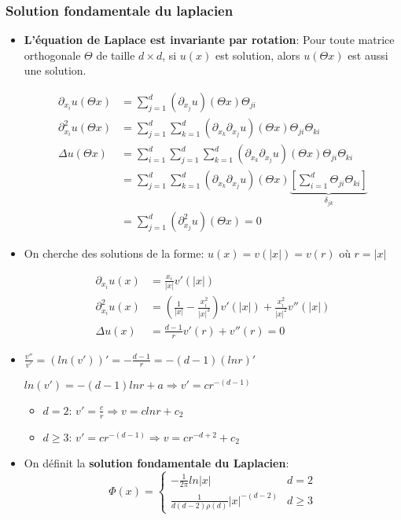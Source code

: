 \documentclass[10pt,a4paper,oneside]{article}
\begin{document}
\subsubsection{Solution fondamentale du laplacien}

\begin{itemize}
\item
\textbf{L'équation de Laplace est invariante par rotation}: Pour toute matrice orthogonale $\Theta$ de taille $d \times d$, si $u(x)$ est solution, alors $u(\Theta x)$ est aussi une solution.

\begin{align*}
\partial_{x_i} u(\Theta x) &= \sum_{j = 1}^d (\partial_{x_j} u)(\Theta x) \Theta_{ji} \\
\partial_{x_i}^2 u(\Theta x) &= \sum_{j = 1}^d \sum_{k = 1}^d (\partial_{x_k} \partial_{x_j} u)(\Theta x) \Theta_{ji} \Theta_{ki} \\
\Delta u(\Theta x) &= \sum_{i = 1}^d \sum_{j = 1}^d \sum_{k = 1}^d (\partial_{x_k} \partial_{x_j} u)(\Theta x) \Theta_{ji} \Theta_{ki} \\
&= \sum_{j = 1}^d \sum_{k = 1}^d (\partial_{x_k} \partial_{x_j} u)(\Theta x) \underbrace{[\sum_{i = 1}^d \Theta_{ji} \Theta_{ki}]}_{\delta_{jk}} \\
&= \sum_{j = 1}^d (\partial^2_{x_j} u)(\Theta x) = 0
\end{align*}

\item
On cherche des solutions de la forme: $u(x) = v(|x|) = v(r)$ où $r = |x|$

\begin{align*}
\partial_{x_i} u(x) &= \frac{x_i}{|x|} v'(|x|) \\
\partial^2_{x_i} u(x) &= (\frac{1}{|x|} - \frac{x_i^2}{|x|^3}) v'(|x|) + \frac{x_i^2}{|x|^2} v''(|x|) \\
\Delta u(x) &= \boxed{\frac{d - 1}{r} v'(r) + v''(r) = 0}
\end{align*}

\item
$\frac{v''}{v'} = (ln (v'))' = -\frac{d - 1}{r} = -(d - 1)(ln r)'$

$ln(v') = -(d - 1)ln r + a \Rightarrow \boxed{v' = cr^{-(d - 1)}}$

\begin{itemize}
\item
$d = 2$: $v' = \frac{c}{r} \Rightarrow v = clnr + c_2$

\item
$d \geq 3$: $v' = cr^{-(d - 1)} \Rightarrow v = cr^{-d + 2} + c_2$
\end{itemize}

\item
On définit la \textbf{solution fondamentale du Laplacien}:
\[\Phi (x) =\begin{cases}
-\frac{1}{2 \pi} ln |x| & d = 2 \\
\frac{1}{d(d - 2)\rho(d)} |x|^{-(d - 2)} & d \geq 3
\end{cases}\]

\end{itemize}
\end{document}
